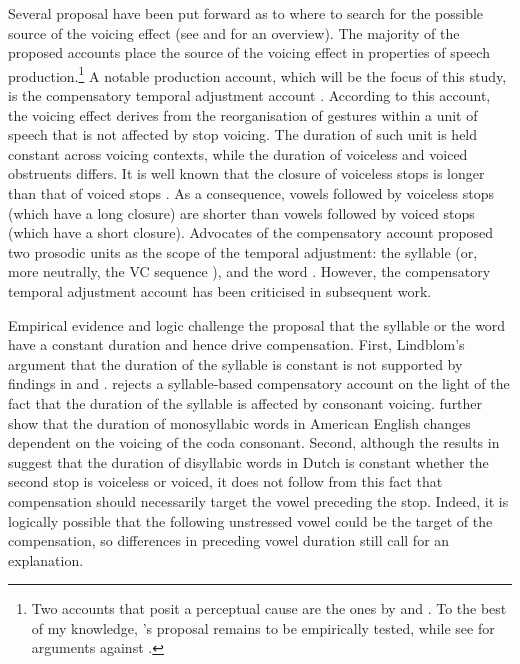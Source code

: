\documentclass[preprint]{JASAnew}
\begin{document}
Several proposal have been put forward as to where to search for the
possible source of the voicing effect (see \citealt{soskuthy2013} and
\citealt{begus2017} for an overview). The majority of the proposed
accounts place the source of the voicing effect in properties of speech
production.\footnote{Two accounts that posit a perceptual cause are the ones by \citet{javkin1976} and \citet{kluender1988}. To the best of my knowledge, \citet{javkin1976}'s proposal remains to be empirically tested, while see \citet{fowler1992} for arguments against \citet{kluender1988}.}
A notable production account, which will be the focus of this study, is
the compensatory temporal adjustment account
\citep{lindblom1967, slis1969a, slis1969, lehiste1970, lehiste1970a}.
According to this account, the voicing effect derives from the
reorganisation of gestures within a unit of speech that is not affected
by stop voicing. The duration of such unit is held constant across
voicing contexts, while the duration of voiceless and voiced obstruents
differs. It is well known that the closure of voiceless stops is longer
than that of voiced stops
\citep{lisker1957, van-summers1987, davis1989, de-jong1991}. As a
consequence, vowels followed by voiceless stops (which have a long
closure) are shorter than vowels followed by voiced stops (which have a
short closure). Advocates of the compensatory account proposed two
prosodic units as the scope of the temporal adjustment: the syllable
(or, more neutrally, the VC sequence \citealt{lindblom1967}), and the
word \citep{slis1969a, slis1969, lehiste1970, lehiste1970a}. However,
the compensatory temporal adjustment account has been criticised in
subsequent work.

Empirical evidence and logic challenge the proposal that the syllable or
the word have a constant duration and hence drive compensation. First,
Lindblom's \citeyearpar{lindblom1967} argument that the duration of the
syllable is constant is not supported by findings in \citet{chen1970}
and \citet{jacewicz2009}. \citet{chen1970} rejects a syllable-based
compensatory account on the light of the fact that the duration of the
syllable is affected by consonant voicing. \citet{jacewicz2009} further
show that the duration of monosyllabic words in American English changes
dependent on the voicing of the coda consonant. Second, although the
results in \citet{slis1969} suggest that the duration of disyllabic
words in Dutch is constant whether the second stop is voiceless or
voiced, it does not follow from this fact that compensation should
necessarily target the vowel preceding the stop. Indeed, it is logically
possible that the following unstressed vowel could be the target of the
compensation, so differences in preceding vowel duration still call for
an explanation.
\end{document}

